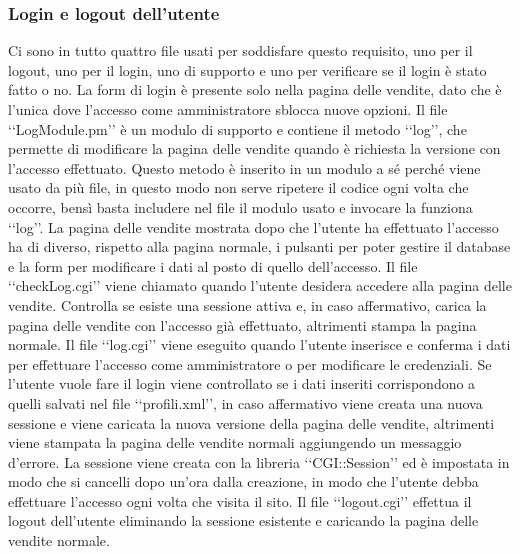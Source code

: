 {{		\subsubsection{Login e logout dell'utente}
			Ci sono in tutto quattro file usati per soddisfare questo requisito, uno per il logout, uno per il login, uno di supporto e uno per verificare se il login è stato fatto o no. La form di login è presente solo nella pagina delle vendite, dato che è l'unica dove l'accesso come amministratore sblocca nuove opzioni.
			Il file ‘‘LogModule.pm’’ è un modulo di supporto e contiene il metodo ‘‘log’’, che permette di modificare la pagina delle vendite quando è richiesta la versione con l'accesso effettuato. Questo metodo è inserito in un modulo a sé perché viene usato da più file, in questo modo non serve ripetere il codice ogni volta che occorre, bensì basta includere nel file il modulo usato e invocare la funziona ‘‘log’’. La pagina delle vendite mostrata dopo che l'utente ha effettuato l'accesso ha di diverso, rispetto alla pagina normale, i pulsanti per poter gestire il database e la form per modificare i dati al posto di quello dell'accesso.
			Il file ‘‘checkLog.cgi’’ viene chiamato quando l'utente desidera accedere alla pagina delle vendite. Controlla se esiste una sessione attiva e, in caso affermativo, carica la pagina delle vendite con l'accesso già effettuato, altrimenti stampa la pagina normale.
			Il file ‘‘log.cgi’’ viene eseguito quando l'utente inserisce e conferma i dati per effettuare l'accesso come amministratore o per modificare le credenziali. Se l'utente vuole fare il login viene controllato se i dati inseriti corrispondono a quelli salvati nel file ‘‘profili.xml’’, in caso affermativo viene creata una nuova sessione e viene caricata la nuova versione della pagina delle vendite, altrimenti viene stampata la pagina delle vendite normali aggiungendo un messaggio d'errore. La sessione viene creata con la libreria ‘‘CGI::Session’’ ed è impostata in modo che si cancelli dopo un'ora dalla creazione, in modo che l'utente debba effettuare l'accesso ogni volta che visita il sito.
			Il file ‘‘logout.cgi’’ effettua il logout dell'utente eliminando la sessione esistente e caricando la pagina delle vendite normale.
}}
